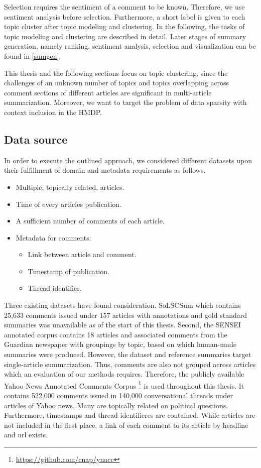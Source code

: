 Selection requires the sentiment of a comment to be known. Therefore, we use sentiment analysis before selection.
Furthermore, a short label is given to each topic cluster after topic modeling and clustering.
In the following, the tasks of topic modeling and clustering are described in detail. Later stages of summary generation, namely ranking, sentiment analysis, selection and visualization can be found in \autoref{sumgen}. \par
This thesis and the following sections focus on topic clustering, since the challenges of an unknown number of topics and topics overlapping across comment sections of different articles are significant in multi-article summarization. Moreover, we want to target the problem of data sparsity with context inclusion in the HMDP.

\subsection{Data source}
In order to execute the outlined approach, we considered different datasets upon their fulfillment of domain and metadata requirements as follows.
\begin{itemize}
\item Multiple, topically related, articles.
\item Time of every articles publication.
\item A sufficient number of comments of each article.
\item Metadata for comments:
\begin{itemize}
\item Link between article and comment.
\item Timestamp of publication.
\item Thread identifier.
\end{itemize}
\end{itemize}
Three existing datasets have found consideration.
SoLSCSum \cite{nguyen16} which contains 25,633 comments issued under 157 articles with annotations and gold standard summaries was unavailable as of the start of this thesis.
Second, the SENSEI annotated corpus \cite{DBLP:conf/sigdial/BarkerPAKHG16} contains 18 articles and associated comments from the Guardian newspaper with groupings by topic, based on which human-made summaries were produced. However, the dataset and reference summaries target single-article summarization. Thus, comments are also not grouped across articles which an evaluation of our methods requires.
Therefore, the publicly available Yahoo News Annotated Comments Corpus \cite{napoles2017ynacc} \footnote{\url{https://github.com/cnap/ynacc}} is used throughout this thesis. It contains 522,000 comments issued in 140,000 conversational threads under articles of Yahoo news. Many are topically related on political questions. Furthermore, timestamps and thread identifieres are contained. While articles are not included in the first place, a link of each comment to its article by headline and url exists.
